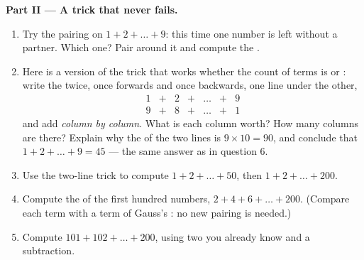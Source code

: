 \begin{problem}
\medskip
\noindent\textbf{Part II --- A trick that never fails.}
\begin{enumerate}[resume]
  \item Try the pairing on $1 + 2 + \dots + 9$: this time one
        number is left without a partner. Which one? Pair around
        it and compute the .
  \item Here is a version of the trick that works whether the
        count of terms is  or : write the  twice, once
        forwards and once backwards, one line under the other,
        \[
        \begin{array}{ccccccc}
        1 & + & 2 & + & \dots & + & 9 \\
        9 & + & 8 & + & \dots & + & 1
        \end{array}
        \]
        and add \emph{column by column}. What is each column
        worth? How many columns are there? Explain why the  of
        the two lines is $9 \times 10 = 90$, and conclude that
        $1 + 2 + \dots + 9 = 45$ --- the same answer as in
        question 6.
  \item Use the two-line trick to compute $1 + 2 + \dots + 50$,
        then $1 + 2 + \dots + 200$.
  \item Compute the  of the first hundred \emph{} numbers,
        $2 + 4 + 6 + \dots + 200$. (Compare each term with a term
        of Gauss's : no new pairing is needed.)
  \item Compute $101 + 102 + \dots + 200$, using two  you
        already know and a subtraction.
\end{enumerate}


\end{problem}

